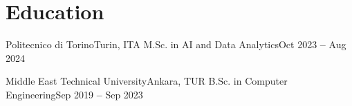 \section{Education}
  \vspace{3pt}
  \resumeSubHeadingListStart
    
    \resumeEducationHeading
      {Politecnico di Torino}{Turin, ITA}
      {M.Sc. in AI and Data Analytics}{Oct 2023 \textbf{--} Aug 2024}{}{}

    \vspace{-0.4cm}
    \resumeEducationHeading
    {Middle East Technical University}{Ankara, TUR}
      {B.Sc. in Computer Engineering}{Sep 2019 \textbf{--} Sep 2023}{}{}

    


  \resumeSubHeadingListEnd
